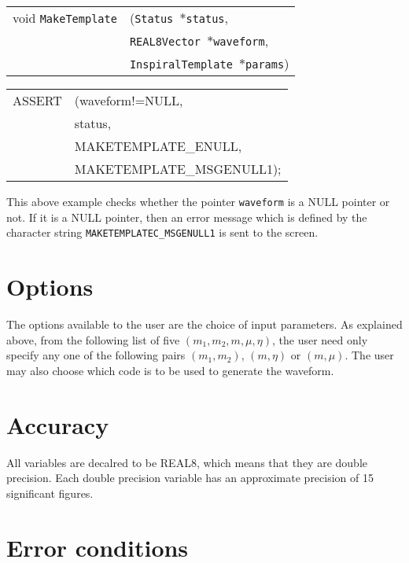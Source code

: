 \documentclass[12pt]{article}
\begin{document}
\vspace{5mm}

\begin{tabular}{ll}
void \texttt{MakeTemplate}&(\texttt{Status $\ast$status},     \\
                                   &\texttt{REAL8Vector $\ast$waveform}, \\
                                   &\texttt{InspiralTemplate $\ast$params})
\end{tabular}

\vspace{5mm}

\begin{tabular}{ll}
ASSERT & (waveform!=NULL, \\
       &  status,  \\
       &  MAKETEMPLATE\_ENULL, \\
       &  MAKETEMPLATE\_MSGENULL1);
\end{tabular}

\vspace{5mm}

This above example checks whether the pointer \texttt{waveform} is a NULL pointer or not. If it is a NULL pointer, then an error message which is defined by the character string \texttt{MAKETEMPLATEC\_MSGENULL1} is sent to the screen.


\section{Options}

The options available to the user are the choice of input parameters. As explained above, from the following list of five $(m_{1},m_{2},m,\mu,\eta)$, the user need only specify any one of the following pairs $(m_{1},m_{2})$, $(m,\eta)$ or $(m,\mu)$. The user may also choose which code is to be used to generate the waveform.

\section{Accuracy}

All variables are decalred to be REAL8, which means that they are double precision.
Each double precision variable has an approximate precision of 15 significant figures.



\section{Error conditions}
\end{document}

